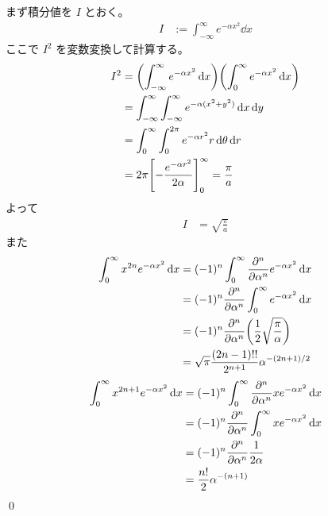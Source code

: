\documentclass[uplatex,dvipdfmx,a4paper,11pt]{jlreq}
\makeatletter
\theoremstyle{definition}
\renewenvironment{proof}[1][\proofname]{\par
  \normalfont
  \topsep6\p@\@plus6\p@ \trivlist
  \item[\hskip\labelsep{\bfseries #1}\@addpunct{\bfseries}]\ignorespaces\quad\par
}{%
  \qed\endtrivlist\@endpefalse
}
\renewcommand\proofname{証明}
\makeatother
\begin{document}
\begin{proof}
  まず積分値を $I$ とおく。
  \begin{align}
    I & := \int_{-\infty}^{\infty} e^{-\alpha x^2}\dd{x}
  \end{align}
  ここで $I^2$ を変数変換して計算する。
  \begin{align}
    I^2 & = \qty(\int_{-\infty}^{\infty} e^{-\alpha x^2}\dd{x})\qty(\int_0^{\infty} e^{-\alpha x^2}\dd{x}) \\
        & = \int_{-\infty}^{\infty}\int_{-\infty}^{\infty} e^{-\alpha (x^2 + y^2)}\dd{x}\dd{y}             \\
        & = \int_{0}^{\infty}\int_{0}^{2\pi} e^{-\alpha r^2}r\dd{\theta}\dd{r}                             \\
        & = 2\pi\qty[-\frac{e^{-\alpha r^2}}{2\alpha}]_{0}^{\infty} = \frac{\pi}{a}
  \end{align}
  よって
  \begin{align}
    I & = \sqrt{\frac{\pi}{a}}
  \end{align}
  また
  \begin{align}
    \int_0^{\infty} x^{2n}e^{-\alpha x^2}\dd{x} & = (-1)^n\int_0^{\infty} \pdv[n]{\alpha}e^{-\alpha x^2}\dd{x}      \\
                                                & = (-1)^n\pdv[n]{\alpha}\int_0^{\infty} e^{-\alpha x^2}\dd{x}      \\
                                                & = (-1)^n\pdv[n]{\alpha}\qty(\frac{1}{2}\sqrt{\frac{\pi}{\alpha}}) \\
                                                & = \sqrt{\pi}\frac{(2n - 1)!!}{2^{n+1}}\alpha^{-(2n + 1)/2}
  \end{align}
  \begin{align}
    \int_0^{\infty} x^{2n + 1}e^{-\alpha x^2}\dd{x} & = (-1)^n\int_0^{\infty}\pdv[n]{\alpha}xe^{-\alpha x^2}\dd{x} \\
                                                    & = (-1)^n\pdv[n]{\alpha}\int_0^{\infty}xe^{-\alpha x^2}\dd{x} \\
                                                    & = (-1)^n\pdv[n]{\alpha}\frac{1}{2\alpha}                     \\
                                                    & = \frac{n!}{2}\alpha^{-(n + 1)}
  \end{align}
\end{proof}
\end{document}
